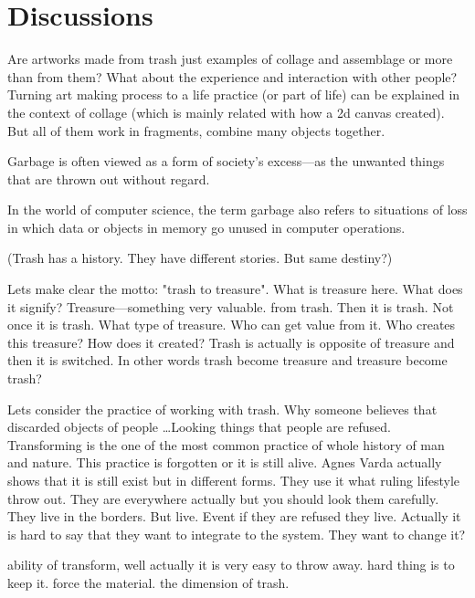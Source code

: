 
\section{Discussions}
Are artworks made from trash just examples of collage and assemblage or more than from them? What about the experience and interaction with other people? Turning art making process to a life practice (or part of life) can be explained in the context of collage (which is mainly related with how a 2d canvas created). But all of them work in fragments, combine many objects together. 

Garbage is often viewed as a form of society’s excess---as the unwanted things that are thrown out without regard. 

In the world of computer science, the term garbage also refers to situations of loss in which data or objects in memory go unused in computer operations.

(Trash has a history. They have different stories. But same destiny?)

Lets make clear the motto: "trash to treasure". What is treasure here. What does it signify? Treasure---something very valuable. from trash. Then it is trash. Not once it is trash. What type of treasure. Who can get value from it. Who creates this treasure? How does it created? Trash is actually is opposite of treasure and then it is switched. In other words trash become treasure and treasure become trash?

Lets consider the practice of working with trash. Why someone believes that discarded objects of people \ldots Looking things that people are refused. Transforming is the one of the most common practice of whole history of man and nature. This practice is forgotten or it is still alive. Agnes Varda actually shows that it is still exist but in different forms. They use it what ruling lifestyle throw out. They are everywhere actually but you should look them carefully. They live in the borders. But live. Event if they are refused they live. Actually it is hard to say that they want to integrate to the system. They want to change it? 

ability of transform, well actually it is very easy to throw away. hard thing is to keep it. force the material. the dimension of trash.


